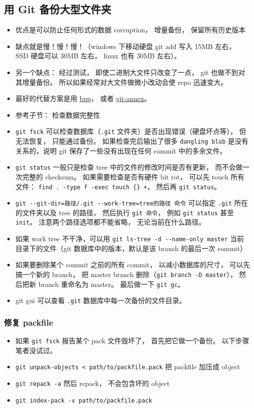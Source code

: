 \subsection{用 Git 备份大型文件夹}
\begin{itemize}
\item 优点是可以防止任何形式的数据 corruption， 增量备份， 保留所有历史版本
\item 缺点就是慢！慢！慢！（windows 下移动硬盘 git add 写入 15MB 左右， SSD 硬盘可以 30MB 左右， linux 也有 30MB 左右）。
\item 另一个缺点： 经过测试， 即使二进制大文件只改变了一点， git 也做不到对其增量备份。 所以如果经常对大文件做微小改动会使 repo 迅速变大。
\item 最好的代替方案是用 \href{https://bup.github.io/}{bup}， 或者 \href{https://git-annex.branchable.com/}{git-annex}。
\item 参考子节： 检查数据完整性
\item \verb`git fsck` 可以检查数据库（\verb`.git` 文件夹）是否出现错误（硬盘坏点等）， 但无法恢复， 只能通过备份。 如果检查完后输出了很多 \verb`dangling blob` 是没有关系的，说明 git 保存了一些没有出现在任何 commit 中的多余文件。
\item \verb`git status` 一般只是检查 tree 中的文件的修改时间是否有更新， 而不会做一次完整的 checksum。 如果需要检查是否有硬件 bit rot， 可以先 touch 所有文件： \verb`find . -type f -exec touch {} +`， 然后再 \verb`git status`。
\item \verb`git --git-dir=路径/.git --work-tree=tree的路径 命令` 可以指定 \verb`.git` 所在的文件夹以及 tree 的路径， 然后执行 \verb`git 命令`， 例如 \verb`git status` 甚至 \verb`init`。 注意两个路径选项都不能省略， 无论当前在什么路径。
\item 如果 work tree 不干净，可以用 \verb`git ls-tree -d --name-only master` 当前目录下的文件（git 数据库中的版本，默认是该 branch 的最后一次 commit）
\item 如果要删除某个 commit 之前的所有 commit， 以减小数据库的尺寸， 可以先搞一个新的 branch， 把 master branch 删除（\verb`git branch -D master`）， 然后把新 branch 重命名为 master。 最后做一下 \verb`git gc`。
\item git gui 可以查看 \verb`.git` 数据库中每一次备份的文件目录。
\end{itemize}

\subsubsection{修复 packfile}
\begin{itemize}
\item 如果 \verb`git fsck` 报告某个 pack 文件毁坏了， 首先把它做一个备份。 以下步骤笔者没试过。
\item \verb`git unpack-objects < path/to/packfile.pack` 把 packfile 加压成 object
\item \verb`git repack -a` 然后 repack， 不会包含坏的 object
\item \verb`git index-pack -v path/to/packfile.pack` 
\end{itemize}


